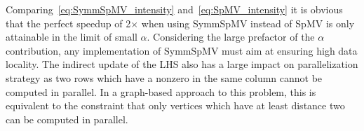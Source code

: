 Comparing~\cref{eq:SymmSpMV_intensity} and~\cref{eq:SpMV_intensity} it is obvious that the perfect speedup of 2$\times$ when using \acrshort{SymmSpMV} instead of \acrshort{SpMV} is only attainable in the limit of small $\alpha$\@. %
Considering the large prefactor of the $\alpha$ contribution, any implementation of \acrshort{SymmSpMV} must aim at ensuring high data locality. The indirect update of the LHS also has a large impact on parallelization strategy as two rows which have a nonzero in the same column cannot be computed in parallel. In a graph-based approach to this problem, this is equivalent to the constraint that only vertices which have at least distance two can be computed in parallel.

\begin{comment}
\subsubsection{\GS and \SYMMGS}
Gauss-Seidel (\GS) is a solver having \DONE dependency. Contrary to the above kernels \GS is in-exact meaning it is an iterative method. \Cref{alg:GS} shows the Gauss-Seidel algorithm where its assumed that the diagonal entries of the matrix are stored as first entry in their corresponding rows.
\begin{algorithm}[H]
	\caption{GS Solve for $x$ : $Ax=b$} 
	\label{alg:GS}
	\begin{algorithmic}[1]
		\FOR{$row=1:nrows$}
		\STATE{$x[row]+=b[row]$}
		\FOR{$idx=rowPtr[row]+1:rowPtr[row+1]$}
		\STATE{$x[row] -= A[idx]*x[col[idx]]$} 
		\ENDFOR
		\STATE{$diag=A[rowPtr[row]]$}
		\STATE{$x[row]/=diag$}
		\ENDFOR
	\end{algorithmic}
\end{algorithm}
Regarding the in-core execution the kernel has same properties as of \acrshort{SpMV}, but requires an additional divide operation per row of the matrix. If the locality ($\alpha$ factor) is not disturbed due to pre-processing the kernel requires same data traffic as of \acrshort{SpMV}. The arithmetic intensity of \GS is the same as that of \acrshort{SpMV}, if we neglect the divide operation that occurs once per every row.
\begin{equation}
\label{eq:GS_intensity}
I_\mathrm{GS} = I_\mathrm{SPMV}
\end{equation}



In general for most of the algorithms one is interested in symmetric operator therefore commonly one would encounter symmetric variant of Gauss-Seidel, so called symmetric Gauss-Seidel (\SYMMGS). The algorithm remains same except that instead of just doing forward sweep shown in \cref{alg:GS} one would follow it with a backward sweep \ie {\tt row=nrows:-1:1}. The intensity of \SYMMGS remains same as of \GS, as we do two times more flops and bring in proportional data.
\end{comment}

